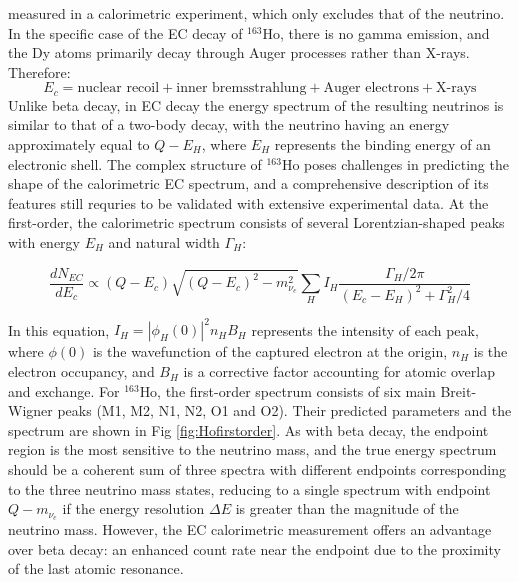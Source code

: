measured in a calorimetric experiment, which only excludes that of the neutrino. In the specific case of the EC decay of $^{163}
$Ho, there is no gamma emission, and the Dy atoms primarily decay through Auger processes rather
than X-rays. Therefore:
\begin{equation}
  E_c = \text{nuclear recoil} + \text{inner bremsstrahlung} + \text{Auger electrons} + \text{X-rays}
\end{equation}
Unlike beta decay, in EC decay the energy spectrum of the resulting neutrinos is similar to that of a two-body decay,
with the neutrino having an energy approximately equal to \(Q - E_H\), where \(E_H\) represents the binding energy of an
electronic
shell. The
complex structure of $^{163}$Ho poses challenges in predicting the shape of the calorimetric EC spectrum, and a
comprehensive description of its features still requries to be validated with extensive experimental data. At the first-order, the calorimetric spectrum consists of several Lorentzian-shaped peaks with energy \(E_H\) and natural width \(\Gamma_H\):

\begin{equation}\label{eq:hofirstorder}
\frac{dN_{EC}}{dE_c} \propto (Q - E_c)\sqrt{(Q - E_c)^2 - m_{\nu_e}^2}
\sum_H I_H\frac{\Gamma_H/2\pi}{(E_c - E_H)^2 + \Gamma_H^2/4}
\end{equation}

In this equation, \(I_H=|\phi_H(0)|^2 n_H B_{H}\) represents the intensity of each peak, where \(\phi(0)\) is the
wavefunction of the captured electron at the origin, \(n_H\) is the electron occupancy, and \(B_H\) is a corrective
factor accounting for atomic overlap and exchange. For $^{163}$Ho, the first-order spectrum consists of six main
Breit-Wigner peaks (M1, M2, N1, N2, O1 and O2). Their predicted parameters and the spectrum are shown in Fig
\ref{fig:Hofirstorder}.
As with beta decay, the endpoint region is the most sensitive to the neutrino mass, and the true energy spectrum should be
a coherent sum of three spectra with different endpoints corresponding to the three neutrino mass states, reducing to a
single spectrum with endpoint $Q-m_{\nu_{e}}$ if the energy resolution $\Delta E$ is greater than the magnitude of the neutrino mass.
However, the EC calorimetric measurement offers an advantage over beta decay: an enhanced count rate near the endpoint due to the proximity of the last atomic resonance.

